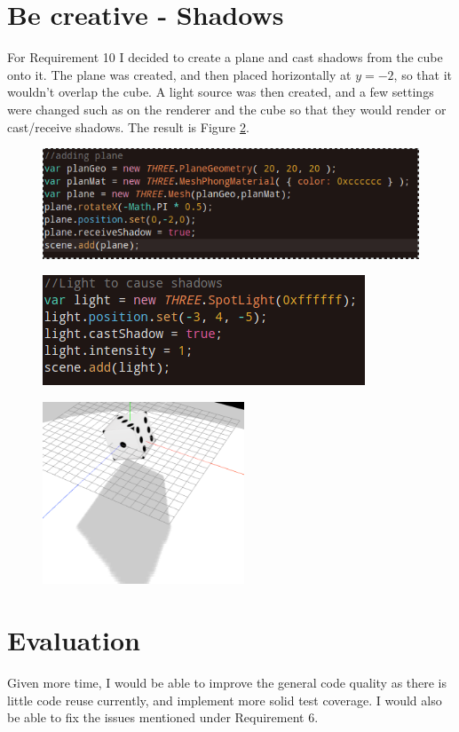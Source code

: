 \documentclass[12pt]{article}
\begin{document}
\section{Be creative - Shadows}
For Requirement 10 I decided to create a plane and cast shadows from the cube onto it. The plane was created,
and then placed horizontally at $y=-2$, so that it wouldn't overlap the cube. A light source was then created, and a few settings were changed 
such as on the renderer and the cube so that they would render or cast/receive shadows. The result is Figure \ref{fig:13}.
\begin{figure}[H]
  \centering
  \begin{minipage}{.5\textwidth}
    \centering
    \includegraphics[width=.9\linewidth]{19.png}
    \label{fig:test1}
  \end{minipage}%
  \begin{minipage}{.5\textwidth}
    \centering
    \includegraphics[width=.9\linewidth]{20.png}
    \label{fig:test2}
  \end{minipage}
  \end{figure}
  \begin{figure}[H]  
    \centering
    \includegraphics[width=6cm]{21.png}
    \caption{}
    \label{fig:13}
  \end{figure}
\section{Evaluation}
Given more time, I would be able to improve the general code quality as there is little code reuse currently, and implement more solid test coverage. I would also be able to fix the issues mentioned under Requirement 6.
\end{document}
